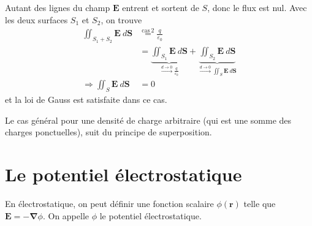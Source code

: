 
Autant des lignes du champ $\boldsymbol{E}$ entrent et sortent de $S$, donc le flux est nul. Avec les deux surfaces $S_{1}$ et $S_{2}$, on trouve 
\begin{align*}
\iint _{S_{1}+S_{2}}\boldsymbol{E}~d\boldsymbol{S} & \overset{\mathrm{cas}~2}= \frac{q}{\varepsilon_{0}} \\
  & = \underbrace{ \iint _{S_{1}}\boldsymbol{E}~d\boldsymbol{S} }_{\overset{d\to 0}\longrightarrow \frac{q}{\varepsilon_{0}}}+\underbrace{ \iint _{S_{2}}\boldsymbol{E}~d\boldsymbol{S} }_{ \overset{d\to 0}\longrightarrow \iint _{S}\boldsymbol{E}~d\boldsymbol{S} } \\
\Rightarrow \iint _{S}\boldsymbol{E}~d\boldsymbol{S} & =0
\end{align*}
et la loi de Gauss est satisfaite dans ce cas.

Le cas général pour une densité de charge arbitraire (qui est une somme des charges ponctuelles), suit du principe de superposition.

\section{Le potentiel électrostatique}
\begin{definition}
En électrostatique, on peut définir une fonction scalaire $\phi(\boldsymbol{r})$ telle que $\boldsymbol{E}=-\boldsymbol{\nabla}\phi$. On appelle $\phi$ le potentiel électrostatique.
\end{definition}

